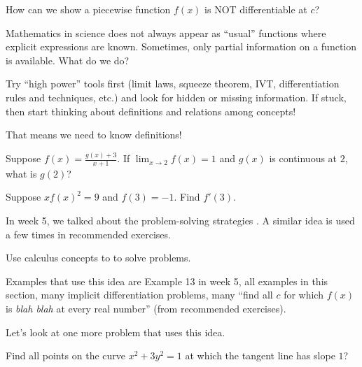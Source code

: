 \documentclass[../main.tex]{subfiles}
\begin{document}

\faComment{} How can we show a piecewise function \(f(x)\) is NOT differentiable at \(c\)?


Mathematics in science does not always appear as ``usual'' functions where explicit expressions are known. Sometimes, only partial information on a function is available. What do we do?

\begin{mdframed}[style=simple-compact]
  Try ``high power'' tools first (limit laws, squeeze theorem, IVT, differentiation rules and techniques, etc.) and look for hidden or missing information. If stuck, then start thinking about definitions and relations among concepts!

  That means we need to know definitions!
\end{mdframed}

\begin{example}
  Suppose \(f(x) = \frac{g(x) + 3}{x+1}\).  If \(\lim_{x \to 2} f(x) = 1\) and \(g(x)\) is continuous at \(2\), what is \(g(2)\)?

\end{example}

\begin{example}
  Suppose \(xf(x)^{2} = 9\) and \(f(3) = -1\). Find \(f'(3)\).

\end{example}
\clearpage

In week 5, we talked about the problem-solving strategies . A similar idea is used a few times in recommended exercises.
\begin{mdframed}[style=simple-compact] \label{strategy:formulate-equation}
  Use calculus concepts to  to solve problems.
\end{mdframed}

Examples that use this idea are Example 13 in week 5, all examples in this section, many implicit differentiation problems, many ``find all \(c\) for which \(f(x)\) is \emph{blah blah} at every real number'' (from recommended exercises).

Let's look at one more problem that uses this idea. 

\begin{example}
  Find all points on the curve \(x^{2} + 3y^{2} = 1\) at which the tangent line has slope \(1\)?

\end{example}
\end{document}
